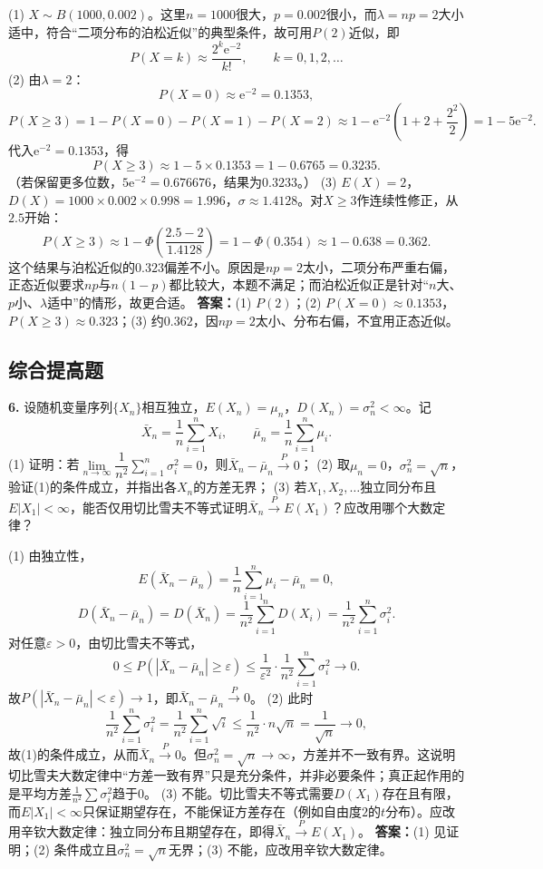 \ifshowsolutions%
(1) $X\sim B(1000,0.002)$。这里$n=1000$很大，$p=0.002$很小，而$\lambda=np=2$大小适中，符合“二项分布的泊松近似”的典型条件，故可用$P(2)$近似，即
\[
P(X=k)\approx\frac{2^k\mathrm{e}^{-2}}{k!},\qquad k=0,1,2,\ldots
\]
(2) 由$\lambda=2$：
\[
P(X=0)\approx\mathrm{e}^{-2}=0.1353,
\]
\[
P(X\geq3)=1-P(X=0)-P(X=1)-P(X=2)
\approx1-\mathrm{e}^{-2}\left(1+2+\frac{2^2}{2}\right)
=1-5\mathrm{e}^{-2}.
\]
代入$\mathrm{e}^{-2}=0.1353$，得
\[
P(X\geq3)\approx1-5\times0.1353=1-0.6765=0.3235.
\]
（若保留更多位数，$5\mathrm{e}^{-2}=0.676676$，结果为$0.3233$。）
(3) $E(X)=2$，$D(X)=1000\times0.002\times0.998=1.996$，$\sigma\approx1.4128$。对$X\geq3$作连续性修正，从$2.5$开始：
\[
P(X\geq3)\approx1-\Phi\!\left(\frac{2.5-2}{1.4128}\right)=1-\Phi(0.354)\approx1-0.638=0.362.
\]
这个结果与泊松近似的$0.323$偏差不小。原因是$np=2$太小，二项分布严重右偏，正态近似要求$np$与$n(1-p)$都比较大，本题不满足；而泊松近似正是针对“$n$大、$p$小、$\lambda$适中”的情形，故更合适。
\textbf{答案：}(1) $P(2)$；(2) $P(X=0)\approx0.1353$，$P(X\geq3)\approx0.323$；(3) 约$0.362$，因$np=2$太小、分布右偏，不宜用正态近似。

\vspace{0.4cm}

\else \answerarea[10] \fi%
%
\subsection{综合提高题}

\textbf{6.} 设随机变量序列$\{X_n\}$相互独立，$E(X_n)=\mu_n$，$D(X_n)=\sigma_n^2<\infty$。记
\[
\bar X_n=\frac1n\sum_{i=1}^{n}X_i,\qquad \bar\mu_n=\frac1n\sum_{i=1}^{n}\mu_i.
\]
(1) 证明：若$\lim\limits_{n\to\infty}\dfrac{1}{n^2}\sum\limits_{i=1}^{n}\sigma_i^2=0$，则$\bar X_n-\bar\mu_n\overset{P}{\longrightarrow}0$；
(2) 取$\mu_n=0$，$\sigma_n^2=\sqrt n$，验证(1)的条件成立，并指出各$X_n$的方差无界；
(3) 若$X_1,X_2,\ldots$独立同分布且$E|X_1|<\infty$，能否仅用切比雪夫不等式证明$\bar X_n\overset{P}{\longrightarrow}E(X_1)$？应改用哪个大数定律？

\ifshowsolutions%
(1) 由独立性，
\[
E(\bar X_n-\bar\mu_n)=\frac1n\sum_{i=1}^{n}\mu_i-\bar\mu_n=0,
\]
\[
D(\bar X_n-\bar\mu_n)=D(\bar X_n)=\frac{1}{n^2}\sum_{i=1}^{n}D(X_i)=\frac{1}{n^2}\sum_{i=1}^{n}\sigma_i^2.
\]
对任意$\varepsilon>0$，由切比雪夫不等式，
\[
0\leq P(|\bar X_n-\bar\mu_n|\geq\varepsilon)
\leq\frac{1}{\varepsilon^2}\cdot\frac{1}{n^2}\sum_{i=1}^{n}\sigma_i^2\longrightarrow0.
\]
故$P(|\bar X_n-\bar\mu_n|<\varepsilon)\to1$，即$\bar X_n-\bar\mu_n\overset{P}{\longrightarrow}0$。
(2) 此时
\[
\frac{1}{n^2}\sum_{i=1}^{n}\sigma_i^2=\frac{1}{n^2}\sum_{i=1}^{n}\sqrt i
\leq\frac{1}{n^2}\cdot n\sqrt n=\frac{1}{\sqrt n}\longrightarrow0,
\]
故(1)的条件成立，从而$\bar X_n\overset{P}{\longrightarrow}0$。但$\sigma_n^2=\sqrt n\to\infty$，方差并不一致有界。这说明切比雪夫大数定律中“方差一致有界”只是充分条件，并非必要条件；真正起作用的是平均方差$\frac{1}{n^2}\sum\sigma_i^2$趋于$0$。
(3) 不能。切比雪夫不等式需要$D(X_1)$存在且有限，而$E|X_1|<\infty$只保证期望存在，不能保证方差存在（例如自由度$2$的$t$分布）。应改用辛钦大数定律：独立同分布且期望存在，即得$\bar X_n\overset{P}{\longrightarrow}E(X_1)$。
\textbf{答案：}(1) 见证明；(2) 条件成立且$\sigma_n^2=\sqrt n$无界；(3) 不能，应改用辛钦大数定律。

